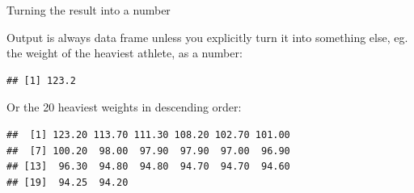 \documentclass[ignorenonframetext,]{beamer}
\newenvironment{Shaded}{\begin{snugshade}}{\end{snugshade}}
\newcommand{\DecValTok}[1]{\textcolor[rgb]{0.00,0.00,0.81}{#1}}
\newcommand{\KeywordTok}[1]{\textcolor[rgb]{0.13,0.29,0.53}{\textbf{#1}}}
\newcommand{\NormalTok}[1]{#1}
\newcommand{\OperatorTok}[1]{\textcolor[rgb]{0.81,0.36,0.00}{\textbf{#1}}}
\newcommand{\StringTok}[1]{\textcolor[rgb]{0.31,0.60,0.02}{#1}}
\begin{document}
\begin{frame}[fragile]{Turning the result into a number}
\protect\hypertarget{turning-the-result-into-a-number}{}

Output is always data frame unless you explicitly turn it into something
else, eg. the weight of the heaviest athlete, as a number:

\begin{Shaded}
\end{Shaded}

\begin{verbatim}
## [1] 123.2
\end{verbatim}

Or the 20 heaviest weights in descending order:

\begin{Shaded}
\end{Shaded}

\begin{verbatim}
##  [1] 123.20 113.70 111.30 108.20 102.70 101.00
##  [7] 100.20  98.00  97.90  97.90  97.00  96.90
## [13]  96.30  94.80  94.80  94.70  94.70  94.60
## [19]  94.25  94.20
\end{verbatim}

\end{frame}
\end{document}
